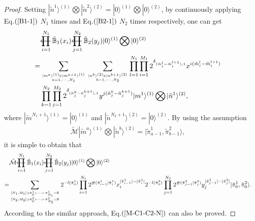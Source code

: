 \documentclass[11pt,reqno]{amsart}
\numberwithin{equation}{section}
\def\lprod{\mathop{\prod{\mkern-29.5mu}{\mathbf\longleftarrow}}}
\begin{document}
	\begin{proof}
		Setting  $|\tilde{n}^{1}\rangle^{(1)}\bigotimes|\tilde{n}^{2}\rangle^{(2)}=|0\rangle^{(1)}\bigotimes|0\rangle^{(2)}$, by continuously applying Eq.$(\ref{B1-1})$ $N_1$ times and Eq.$(\ref{B2-1})$ $N_2$ times respectively, one can get
		\begin{align}
			&\lprod_{i=1}^{N_1} \tilde{\mathbb{B}}_{1}(x_i)
			\lprod_{j=1}^{N_2} \tilde{\mathbb{B}}_{2}(y_j)
			|0\rangle^{(1)}\bigotimes|0\rangle^{(2)}\notag\\
			=&\sum_{{|m^{a}\rangle^{(1)} \triangleright |m^{a+1}\rangle^{(1)}}
				\atop{a=1,\cdots,N_1}}
			\sum_{{|n^{b}\rangle^{(2)} \triangleright |n^{b+1}\rangle^{(2)}}
				\atop{b=1,\cdots,N_2}}
			\prod_{l=1}^{N_1}\prod_{i=1}^{M_1}
			2^{\delta_{(\tilde{m}^{l}_i - \tilde{m}^{l+1}_i), 1}}
			x^{i(\tilde{m}^{l}_i - \tilde{m}^{l+1}_i)}\notag\\
			&	\prod_{k=1}^{N_2}\prod_{j=1}^{M_2}
			2^{\delta_{(\tilde{n}^{k}_j - \tilde{n}^{k+1}_j), 1}}
			y^{j(\tilde{n}^{k}_j - \tilde{n}^{k+1}_j)}
			|m^{1}\rangle^{(1)}\bigotimes|\tilde{n}^{1}\rangle^{(2)},
		\end{align}
		where $|\tilde{m}^{N_1+1}\rangle^{(1)}=|0\rangle^{(1)}$ and  $|\tilde{n}^{N_2+1}\rangle^{(2)}=|0\rangle^{(2)}$.
		By using the assumption
		\begin{align}
			\tilde{\mathcal{M}} |\tilde{m}^{a}\rangle^{(1)}\bigotimes|\tilde{n}^{b}\rangle^{(2)}
			=|\tilde{\pi}_{a-1}^{1},\tilde{\pi}_{b-1}^{2}\rangle,
		\end{align}
		it is simple to obtain that
		\begin{align}
			&\tilde{\mathcal{M}}
			\lprod_{i=1}^{N_1} \tilde{\mathbb{B}}_{1}(x_i)
			\lprod_{j=1}^{N_2} \tilde{\mathbb{B}}_{2}(y_j)
			|0\rangle^{(1)}\bigotimes|0\rangle^{(2)}\notag\\
			= &\sum_{{ [N_{1},M_{1}] \ni \tilde{\pi}^{1}_0 \succ \cdots \succ \tilde{\pi}^{1}_{N_{1}} = \emptyset}
				\atop{[N_{2},M_{2}] \ni \tilde{\pi}^{2}_0 \succ \cdots \succ \tilde{\pi}^{2}_{N_{2}} = \emptyset}} 	
			2^{-l(\tilde{\pi}^{1}_{0})}
			\prod_{i=1}^{N_1}
			2^{\#(\tilde{\pi}^{1}_{i-1}|\tilde{\pi}^{1}_{i}) }		
			x_i^{|\tilde{\pi}^{1}_{i-1}| - |\tilde{\pi}^{1}_i|}
			2^{-l(\tilde{\pi}^{2}_{0})}	
			\prod_{j=1}^{N_2}
			2^{\#(\tilde{\pi}^{2}_{j-1}|\tilde{\pi}^{2}_{j}) }		
			y_j^{|\tilde{\pi}^{2}_{j-1}| - |\tilde{\pi}^{2}_j|}
			| \tilde{\pi}^{1}_0,\tilde{\pi}^{2}_0 \rangle.
		\end{align}	
		According to the similar approach, Eq.$(\ref{M-C1-C2-N})$ can also be proved.
	\end{proof}
	
\end{document}
